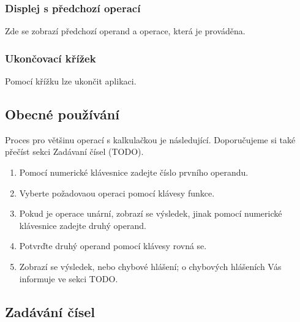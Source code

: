 \documentclass[a5paper]{article}
\begin{document}
    \subsubsection{Displej s předchozí operací}
    Zde se zobrazí předchozí operand a operace, která je prováděna.

    \subsubsection{Ukončovací křížek}
    Pomocí křížku lze ukončit aplikaci.

    \subsection{Obecné používání}
    Proces pro většinu operací s kalkulačkou je následující. Doporučujeme si také přečíst sekci Zadávaní čísel (TODO).
    \begin{enumerate}
        \item Pomocí numerické klávesnice zadejte číslo prvního operandu.
        \item Vyberte požadovaou operaci pomocí klávesy funkce.
        \item Pokud je operace unární, zobrazí se výsledek, jinak pomocí numerické klávesnice zadejte druhý operand.
        \item Potvrďte druhý operand pomocí klávesy rovná se.
        \item Zobrazí se výsledek, nebo chybové hlášení; o chybových hlášeních Vás informuje ve sekci TODO.
    \end{enumerate}
    \subsection{Zadávání čísel}
\end{document}
